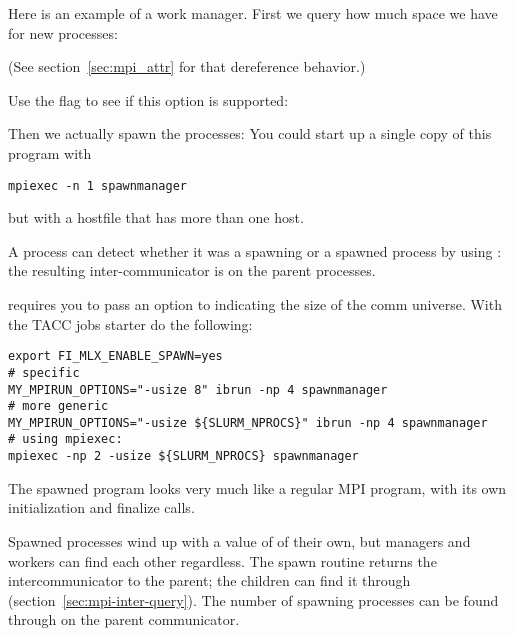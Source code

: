 Here is an example of a work manager.
%
First we query how much space we have for new processes:
%

(See section~\ref{sec:mpi_attr} for that dereference behavior.)

Use the flag to see if this option is supported:

Then we actually spawn the processes:
%
%
%
You could start up a single copy of this program with 
\begin{verbatim}
mpiexec -n 1 spawnmanager
\end{verbatim}
but with a hostfile that has more than one host.

A process can detect whether it was a spawning or a spawned process
by using :
the resulting inter-communicator is 
on the parent processes.

\begin{taccnote}
 requires you to pass an option  to
 indicating the size of the comm universe. With the TACC
jobs starter  do the following:
\begin{verbatim}
export FI_MLX_ENABLE_SPAWN=yes
# specific
MY_MPIRUN_OPTIONS="-usize 8" ibrun -np 4 spawnmanager
# more generic
MY_MPIRUN_OPTIONS="-usize ${SLURM_NPROCS}" ibrun -np 4 spawnmanager
# using mpiexec:
mpiexec -np 2 -usize ${SLURM_NPROCS} spawnmanager
\end{verbatim}
\end{taccnote}
The spawned program looks very much like a regular MPI program, with
its own initialization and finalize calls.

%

Spawned processes wind up with a value of  of their
own, but managers and workers can find each other regardless.
The spawn routine returns the intercommunicator to the parent; the children
can find it through  (section~\ref{sec:mpi-inter-query}).
The number of spawning processes can be found through
 on the parent communicator.

